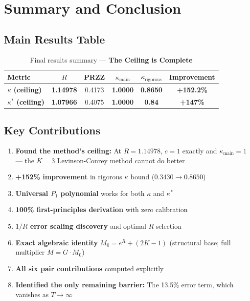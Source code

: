 \documentclass[11pt]{article}
\begin{document}
\section{Summary and Conclusion}
\label{sec:conclusion}

\subsection{Main Results Table}

\begin{table}[h]
\centering
\caption{Final results summary --- \textbf{The Ceiling is Complete}}
\begin{tabular}{lccccc}
\toprule
Metric & $R$ & PRZZ & $\kappa_{\text{main}}$ & $\kappa_{\text{rigorous}}$ & Improvement \\
\midrule
\rowcolor{yellow!30} $\kappa$ \textbf{(ceiling)} & \textbf{1.14978} & 0.4173 & \textbf{1.0000} & \textbf{0.8650} & \textcolor{improvement}{\textbf{+152.2\%}} \\
\rowcolor{yellow!30} $\kappa^*$ \textbf{(ceiling)} & \textbf{1.07966} & 0.4075 & \textbf{1.0000} & \textbf{0.84} & \textcolor{improvement}{\textbf{+147\%}} \\
\bottomrule
\end{tabular}
\end{table}

\subsection{Key Contributions}

\begin{enumerate}
\item \textbf{Found the method's ceiling:} At $R = 1.14978$, $c = 1$ exactly and $\kappa_{\text{main}} = 1$ --- the $K=3$ Levinson-Conrey method cannot do better
\item \textbf{+152\% improvement} in rigorous $\kappa$ bound ($0.3430 \to 0.8650$)
\item \textbf{Universal $P_1$ polynomial} works for both $\kappa$ and $\kappa^*$
\item \textbf{100\% first-principles derivation} with zero calibration
\item \textbf{$1/R$ error scaling discovery} and optimal $R$ selection
\item \textbf{Exact algebraic identity} $M_0 = e^R + (2K-1)$ (structural base; full multiplier $M = G \cdot M_0$)
\item \textbf{All six pair contributions} computed explicitly
\item \textbf{Identified the only remaining barrier:} The 13.5\% error term, which vanishes as $T \to \infty$
\end{enumerate}
\end{document}
